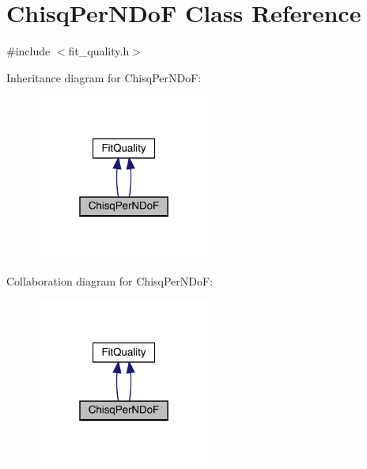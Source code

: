 \hypertarget{classChisqPerNDoF}{}\section{Chisq\+Per\+N\+DoF Class Reference}
\label{classChisqPerNDoF}


{\ttfamily \#include $<$fit\+\_\+quality.\+h$>$}



Inheritance diagram for Chisq\+Per\+N\+DoF\+:
\nopagebreak
\begin{figure}[H]
\begin{center}
\leavevmode
\includegraphics[width=163pt]{d3/d0f/classChisqPerNDoF__inherit__graph}
\end{center}
\end{figure}


Collaboration diagram for Chisq\+Per\+N\+DoF\+:
\nopagebreak
\begin{figure}[H]
\begin{center}
\leavevmode
\includegraphics[width=163pt]{dd/da2/classChisqPerNDoF__coll__graph}
\end{center}
\end{figure}
